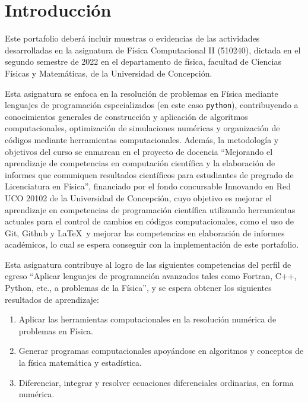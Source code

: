 \documentclass[../portafolio.tex]{subfiles}
\begin{document}

\chapter*{Introducción}

Este portafolio deberá incluir muestras o evidencias de las actividades desarrolladas en la asignatura de Física Computacional II (510240), dictada en el segundo semestre de 2022 en el departamento de física, facultad de Ciencias Físicas y Matemáticas, de la Universidad de Concepción.

\medskip

Esta asignatura se enfoca en la resolución de problemas en Física
mediante lenguajes de programación especializados (en este caso
\texttt{python}), contribuyendo a conocimientos generales de
construcción y aplicación de algoritmos computacionales, optimización
de simulaciones numéricas y organización de códigos mediante
herramientas computacionales. Además, la metodología y objetivos del
curso se enmarcan en el proyecto de docencia ``Mejorando el
aprendizaje de competencias en computación científica y la elaboración
de informes que comuniquen resultados científicos para estudiantes de
pregrado de Licenciatura en Física'', financiado por el fondo
concursable Innovando en Red UCO 20102 de la Universidad de
Concepción, cuyo objetivo es mejorar el aprendizaje en competencias de
programación científica utilizando herramientas actuales para el
control de cambios en códigos computacionales, como el uso de Git,
Github y \LaTeX\, y mejorar las competencias en elaboración de
informes académicos, lo cual se espera conseguir con la implementación
de este portafolio.

\medskip

Esta asignatura contribuye al logro de las siguientes competencias del
perfil de egreso ``Aplicar lenguajes de programación avanzados tales
como Fortran, C++, Python, etc., a problemas de la Física'', y se espera obtener los siguientes resultados de aprendizaje:
\begin{enumerate}
\item Aplicar las herramientas computacionales en la resolución numérica de problemas en Física.
\item Generar programas computacionales apoyándose en algoritmos y conceptos de la física matemática y
estadística.
\item Diferenciar, integrar y resolver ecuaciones diferenciales ordinarias, en forma numérica.
\end{enumerate}
\end{document}
